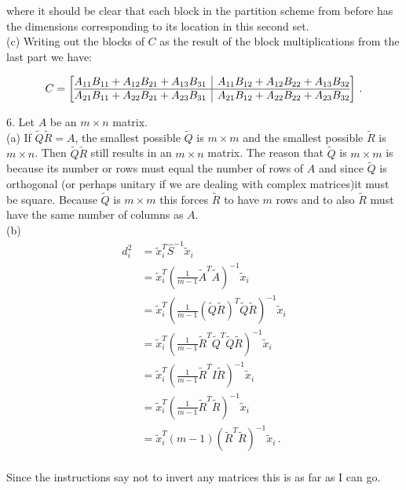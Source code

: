 \documentclass[11pt]{article}
\begin{document}
where it should be clear that each block in the partition scheme from before has the dimensions corresponding to its location in this second set.\\

(c) Writing out the blocks of $C$ as the result of the block multiplications from the last part we have:

\[
  C = \left[\begin{array}{@{}c|c@{}}
    A_{11}B_{11}+A_{12}B_{21}+A_{13}B_{31} & A_{11}B_{12}+A_{12}B_{22}+A_{13}B_{32} \\ \hline
    A_{21}B_{11}+A_{22}B_{21}+A_{23}B_{31} & A_{21}B_{12}+A_{22}B_{22}+A_{23}B_{32} \\
  \end{array}\right] \,.
\]

6. Let $A$ be an $m \times n$ matrix.\\

(a) If $\widetilde{Q}\widetilde{R} = A$, the smallest possible $\widetilde{Q}$ is $m \times
m$ and the smallest possible $\widetilde{R}$ is $m \times n$. Then $\widetilde{Q}\widetilde{R}$ still results in an $m \times n$ matrix. The reason that $\widetilde{Q}$ is $m \times m$ is because its number or rows must equal the number of rows of $A$ and since $\widetilde{Q}$ is orthogonal (or perhaps unitary if we are dealing with complex matrices)it must be square. Because $\widetilde{Q}$ is $m \times m$ this forces $\widetilde{R}$ to have $m$ rows and to also $\widetilde{R}$ must have the same number of columns as $A$.\\

(b)
\begin{align*}
d_i^2 &= \tilde{x}_i^T \hat{S}^{-1} \tilde{x}_i \\
	  &= \tilde{x}_i^T \left(\frac{1}{m-1}\tilde{A}^T \tilde{A} \right)^{-1} \tilde{x}_i \\
	  &= \tilde{x}_i^T \left(\frac{1}{m-1}(\tilde{Q}\tilde{R})^T\tilde{Q}\tilde{R}\right)^{-1} \tilde{x}_i \\
	  &= \tilde{x}_i^T \left(\frac{1}{m-1} \tilde{R}^T\tilde{Q}^T\tilde{Q}\tilde{R}\right)^{-1} \tilde{x}_i \\
	  &= \tilde{x}_i^T \left(\frac{1}{m-1} \tilde{R}^TI\tilde{R}\right)^{-1} \tilde{x}_i \\
	  &= \tilde{x}_i^T \left(\frac{1}{m-1} \tilde{R}^T\tilde{R}\right)^{-1} \tilde{x}_i \\
	  &= \tilde{x}_i^T (m-1) \left(\tilde{R}^T\tilde{R}\right)^{-1} \tilde{x}_i \,. \\
\end{align*}

Since the instructions say not to invert any matrices this is as far as I can go.
\end{document}
